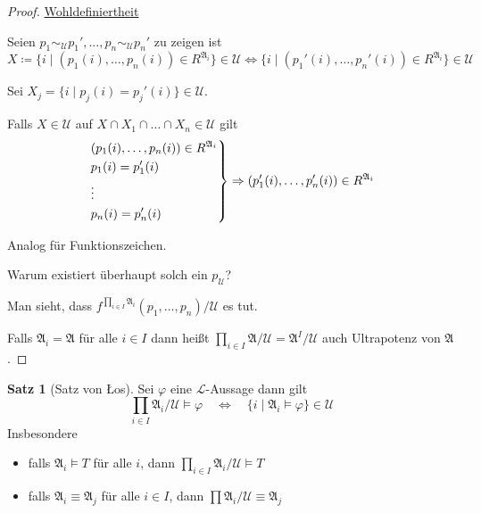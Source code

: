 \documentclass[12pt,parskip=full]{scrartcl}
\newcommand{\heading}{\underline}
\theoremstyle{definition}
\newtheorem{theorem}{Satz}[section]
\begin{document}
	\begin{proof}
		\heading{Wohldefiniertheit}
		
		Seien $p_1 \sim_\mathcal{U} p_1', \dots, p_n \sim_\mathcal{U} p_n'$ zu zeigen ist
		\begin{equation*}
			X \coloneqq \{ i \mid (p_1(i), \dots, p_n(i)) \in R^{\mathfrak{A}_i} \} \in \mathcal{U} \Leftrightarrow \{ i \mid (p_1'(i), \dots, p_n'(i)) \in R^{\mathfrak{A}_i} \} \in \mathcal{U}
		\end{equation*}
		
		Sei $X_j = \{ i \mid p_j(i) = p_j'(i) \} \in \mathcal{U}$.
		
		Falls $X \in \mathcal{U}$ auf $X \cap X_1 \cap \dots \cap X_n \in \mathcal{U}$ gilt
		\begin{equation*}
			\begin{drcases}
				(p_1(i), \dots, p_n(i)) \in R^{\mathfrak{A}_i} \\
				p_1(i) = p_1'(i) \\
				\vdots \\
				p_n(i) = p_n'(i)
			\end{drcases} \Rightarrow (p_1'(i), \dots, p_n'(i)) \in R^{\mathfrak{A}_i}
		\end{equation*}
		
		Analog für Funktionszeichen.
		
		Warum existiert überhaupt solch ein $p_\mathcal{U}$?
		
		Man sieht, dass $f^{\prod_{i \in I} \mathfrak{A}_i} (p_1, \dots, p_n) / \mathcal{U}$ es tut.
		
		Falls $\mathfrak{A}_i = \mathfrak{A}$ für alle $i \in I$ dann heißt $\prod_{i \in I} \mathfrak{A}/\mathcal{U} = \mathfrak{A}^I/\mathcal{U}$ auch Ultrapotenz von $\mathfrak{A}$.
	\end{proof}

	\begin{theorem}[Satz von \L os]
		Sei $\varphi$ eine $\mathcal{L}$-Aussage dann gilt
		\begin{equation*}
			\prod_{i \in I} \mathfrak{A}_i / \mathcal{U} \models \varphi \quad\Leftrightarrow\quad \{ i \mid \mathfrak{A}_i \models \varphi \} \in \mathcal{U}
		\end{equation*}
		Insbesondere 
		\begin{itemize}
			\item falls $\mathfrak{A}_i \models T$ für alle $i$, dann $\prod_{i \in I} \mathfrak{A}_i / \mathcal{U} \models T$
			\item falls $\mathfrak{A}_i \equiv \mathfrak{A}_j$ für alle $i \in I$, dann $\prod \mathfrak{A}_i / \mathcal{U} \equiv \mathfrak{A}_j$
		\end{itemize}
	\end{theorem}
\end{document}
